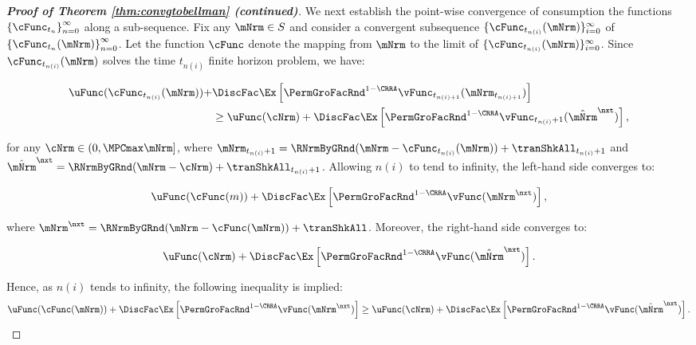 \documentclass[\econtexRoot/BufferStockTheory]{subfiles}
\begin{document}
\begin{proof}[\textbf{Proof of Theorem \ref{thm:convgtobellman} (continued)}]
%
We next establish the point-wise convergence of consumption the functions $\left\{ \cFunc_{t_{n}}\right\}_{n=0}^{\infty}$ along a sub-sequence.
Fix any $\mNrm\in S$ and consider a convergent subsequence $\{\cFunc_{t_{n(i)}}(\mNrm)\}_{i=0}^{\infty}$ of $\left\{ \cFunc_{t_{n}}(\mNrm) \right\}_{n=0}^{\infty}$.
Let the function $\cFunc$ denote the mapping from $\mNrm$ to the limit of $\{\cFunc_{t_{n(i)}}(\mNrm)\}_{i=0}^{\infty}$.
Since $\cFunc_{t_{n(i)}}(\mNrm)$ solves the time $t_{n(i)}$ finite horizon problem, we have:

\begin{samepage}
\begin{equation}
\begin{aligned}
\uFunc(\cFunc_{t_{n(i)}}(\mNrm)) + & \DiscFac \Ex \left[ {\PermGroFacRnd}^{1 - \CRRA} \vFunc_{t_{n(i)+1}}(\mNrm_{t_{n(i)+1}}) \right] \\ 
& \geq \uFunc(\cNrm) + \DiscFac \Ex \left[ {\PermGroFacRnd}^{1 - \CRRA} \vFunc_{t_{n(i)}+1}(\hat{\mNrm}^{\nxt}) \right], 
\end{aligned}
\end{equation}
\end{samepage}
for any $\cNrm \in (0, \MPCmax \mNrm]$, where $\mNrm_{t_{n(i)}+1} = \RNrmByGRnd(\mNrm - \cFunc_{t_{n(i)}}(\mNrm)) + \tranShkAll_{t_{n(i)}+1}$ and $\hat{\mNrm}^{\nxt} = \RNrmByGRnd(\mNrm - \cNrm) + \tranShkAll_{t_{n(i)}+1}$.
%
Allowing $n(i)$ to tend to infinity, the left-hand side converges to:
 
\begin{equation}
\uFunc(\cFunc(m)) + \DiscFac \Ex \left[ {\PermGroFacRnd}^{1 - \CRRA} \vFunc(\mNrm^{\nxt}) \right],
\end{equation}

where $\mNrm^{\nxt} = \RNrmByGRnd(\mNrm - \cFunc(\mNrm)) + \tranShkAll$.
Moreover, the right-hand side converges to:

\begin{equation}
\uFunc(\cNrm) + \DiscFac \Ex \left[ {\PermGroFacRnd}^{1 - \CRRA} \vFunc(\hat{\mNrm}^{\nxt}) \right].
\end{equation}

Hence, as $n(i)$ tends to infinity, the following inequality is implied:
\begin{equation}
\uFunc(\cFunc(\mNrm)) + \DiscFac \Ex \left[ {\PermGroFacRnd}^{1 - \CRRA} \vFunc(\mNrm^{\nxt}) \right] \geq \uFunc(\cNrm) + \DiscFac \Ex \left[ {\PermGroFacRnd}^{1 - \CRRA} \vFunc(\hat{\mNrm}^{\nxt}) \right].
\end{equation}


\end{proof}
\end{document}
